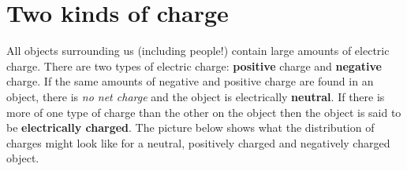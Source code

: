             \section{Two kinds of charge}
            \nopagebreak
      \label{m38780*id200267}All objects surrounding us (including people!) contain large amounts of electric charge. There
are two types of electric charge: \textbf{positive} charge and \textbf{negative} charge.
If the same amounts of negative and positive charge are found in an object, there
is \textsl{no net charge} and the object is electrically \textbf{neutral}. If there is more of one type of charge than the other on the object then the object is said to be \textbf{electrically charged}. The picture below shows
what the distribution of charges might look like for a neutral, positively charged and
negatively charged object.\par 
      \label{m38780*id200640}
